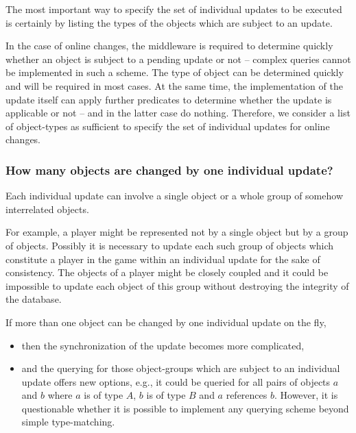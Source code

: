 \documentclass[a4paper, 10pt]{book}
\begin{document}
            The most important way to specify the set of individual updates to be
            executed is certainly by listing the types of the objects which
            are subject to an update.

            In the case of online changes, the middleware is required to determine
            quickly whether an object is subject to a pending update or not --
            complex queries cannot be implemented in such a scheme. 
            The type of object can be determined quickly and will be required in
            most cases. At the same time, the implementation of the update itself
            can apply further predicates to determine whether the update is
            applicable or not -- and in the latter case do nothing.
            Therefore, we consider a list of object-types as sufficient
            to specify the set of individual updates for online changes.

            \subsubsection{How many objects are changed by one individual update?} 

            Each individual update can involve a single object or a whole group of
            somehow interrelated objects.

            For example, a player might be represented not by a single object but
            by a group of objects. Possibly it is necessary to update
            each such group of objects which constitute a player in the game
            within an individual update for the sake of consistency. The objects
            of a player might be closely coupled and it could be impossible to
            update each object of this group without destroying
            the integrity of the database.

            If more than one object can be changed by one individual update on the
            fly,
            \begin{itemize}
                \item then the synchronization of the update becomes more complicated,
                \item and the querying for those object-groups which are subject to an
                    individual update offers new options, e.g., it could be queried
                    for all pairs of objects $a$ and $b$ where  $a$ is of type $A$, $b$
                    is of type $B$ and $a$ references $b$. However, it is
                    questionable whether it is possible to implement any querying scheme
                    beyond simple type-matching. 
            \end{itemize}
\end{document}
